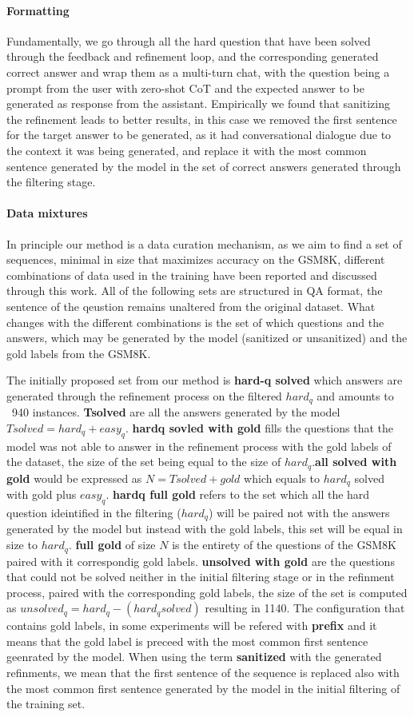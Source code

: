 \documentclass[a4paper,10pt]{article}
\begin{document}
\paragraph{Formatting}
Fundamentally, we go through all the hard question that have been solved through the feedback and refinement loop, and the corresponding generated correct answer and wrap them as a multi-turn chat, with the question being a prompt from the user with zero-shot CoT and the expected answer to be generated as response from the assistant. Empirically we found that sanitizing the refinement leads to better results, in this case we removed the first sentence for the target answer to be generated, as it had conversational dialogue due to the context it was being generated, and replace it with the most common sentence generated by the model in the set of correct answers generated through the filtering stage. 
\paragraph{Data mixtures}
In principle our method is a data curation mechanism, as we aim to find a set of sequences, minimal in size that maximizes accuracy on the GSM8K, different combinations of data used in the training have been reported and discussed through this work. All of the following sets are structured in QA format, the sentence of the qeustion remains unaltered from the original dataset. What changes with the different combinations is the set of which questions and the answers, which may be generated by the model (sanitized or unsanitized) and the gold labels from the GSM8K. 

The initially proposed set from our method is \textbf{hard-q solved} which answers are generated through the refinement process on the filtered $hard_q$ and amounts to ~940 instances. \textbf{Tsolved} are all the answers generated by the model $Tsolved = hard_q + easy_q$.  \textbf{hardq sovled with gold} fills the questions that the model was not able to answer in the refinement process with the gold labels of the dataset, the size of the set being equal to the size of $hard_q$.\textbf{all solved with gold} would be expressed as $N = Tsolved + gold$ which equals to $hard_q$ solved with gold plus $easy_q$. \textbf{hardq full gold} refers to the set which all the hard question ideintified in the filtering ($hard_q$) will be paired not with the answers generated by the model but instead with the gold labels, this set will be equal in size to $hard_q$. \textbf{full gold} of size $N$ is the entirety of the questions of the GSM8K paired with it correspondig gold labels. \textbf{unsolved with gold} are the questions that could not be solved neither in the initial filtering stage or in the refinment process, paired with the corresponding gold labels, the size of the set is computed as $unsolved_q = hard_q - (hard_q solved)$ resulting in 1140. The configuration that contains gold labels, in some experiments will be refered with \textbf{prefix} and it means that the gold label is preceed with the most common first sentence geenrated by the model. When using the term \textbf{sanitized} with the generated refinments, we mean that the first sentence of the sequence is replaced also with the most common first sentence generated by the model in the initial filtering of the training set.
\end{document}
